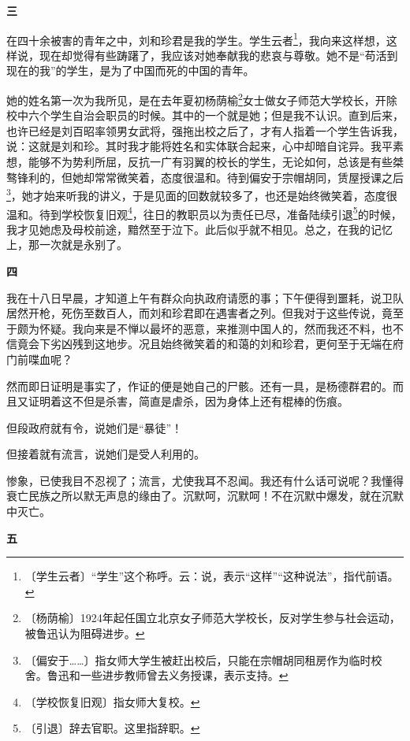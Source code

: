 \documentclass[12pt,UTF-8,openany]{ctexbook}
\begin{document}
\begin{normalsize}
    \begin{center}\textbf{三}\end{center}
    
    在四十余被害的青年之中，刘和珍君是我的学生。学生云者\footnote{〔学生云者〕“学生”这个称呼。云：说，表示“这样”“这种说法”，指代前语。}，我向来这样想，这样说，现在却觉得有些踌躇了，我应该对她奉献我的悲哀与尊敬。她不是“苟活到现在的我”的学生，是为了中国而死的中国的青年。
    
    她的姓名第一次为我所见，是在去年夏初杨荫榆\footnote{〔杨荫榆〕1924年起任国立北京女子师范大学校长，反对学生参与社会运动，被鲁迅认为阻碍进步。}女士做女子师范大学校长，开除校中六个学生自治会职员的时候。其中的一个就是她；但是我不认识。直到后来，也许已经是刘百昭率领男女武将，强拖出校之后了，才有人指着一个学生告诉我，说：这就是刘和珍。其时我才能将姓名和实体联合起来，心中却暗自诧异。我平素想，能够不为势利所屈，反抗一广有羽翼的校长的学生，无论如何，总该是有些桀骜锋利的，但她却常常微笑着，态度很温和。待到偏安于宗帽胡同，赁屋授课之后\footnote{〔偏安于……〕指女师大学生被赶出校后，只能在宗帽胡同租房作为临时校舍。鲁迅和一些进步教师曾去义务授课，表示支持。}，她才始来听我的讲义，于是见面的回数就较多了，也还是始终微笑着，态度很温和。待到学校恢复旧观\footnote{〔学校恢复旧观〕指女师大复校。}，往日的教职员以为责任已尽，准备陆续引退\footnote{〔引退〕辞去官职。这里指辞职。}的时候，我才见她虑及母校前途，黯然至于泣下。此后似乎就不相见。总之，在我的记忆上，那一次就是永别了。
    
    \begin{center}\textbf{四}\end{center}
    
    我在十八日早晨，才知道上午有群众向执政府请愿的事；下午便得到噩耗，说卫队居然开枪，死伤至数百人，而刘和珍君即在遇害者之列。但我对于这些传说，竟至于颇为怀疑。我向来是不惮以最坏的恶意，来推测中国人的，然而我还不料，也不信竟会下劣凶残到这地步。况且始终微笑着的和蔼的刘和珍君，更何至于无端在府门前喋血呢？
    
    然而即日证明是事实了，作证的便是她自己的尸骸。还有一具，是杨德群君的。而且又证明着这不但是杀害，简直是虐杀，因为身体上还有棍棒的伤痕。
    
    但段政府就有令，说她们是“暴徒”！
    
    但接着就有流言，说她们是受人利用的。
    
    惨象，已使我目不忍视了；流言，尤使我耳不忍闻。我还有什么话可说呢？我懂得衰亡民族之所以默无声息的缘由了。沉默呵，沉默呵！不在沉默中爆发，就在沉默中灭亡。
    
    \begin{center}\textbf{五}\end{center}
    

\end{normalsize}
\end{document}
